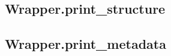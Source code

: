 \subsection{Wrapper.print\_structure} \label{subchapter:wrapper.print_structure}
    

\subsection{Wrapper.print\_metadata} \label{subchapter:wrapper.print_metadata}
    


